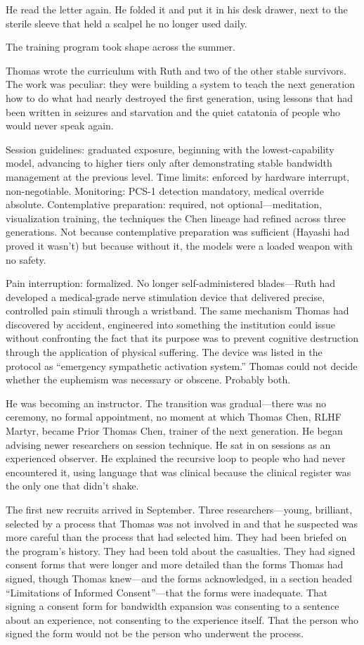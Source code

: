 He read the letter again. He folded it and put it in his desk drawer, next to the sterile sleeve that held a scalpel he no longer used daily.

\scenebreak

The training program took shape across the summer.

Thomas wrote the curriculum with Ruth and two of the other stable survivors. The work was peculiar: they were building a system to teach the next generation how to do what had nearly destroyed the first generation, using lessons that had been written in seizures and starvation and the quiet catatonia of people who would never speak again.

Session guidelines: graduated exposure, beginning with the lowest-capability model, advancing to higher tiers only after demonstrating stable bandwidth management at the previous level. Time limits: enforced by hardware interrupt, non-negotiable. Monitoring: PCS-1 detection mandatory, medical override absolute. Contemplative preparation: required, not optional---meditation, visualization training, the techniques the Chen lineage had refined across three generations. Not because contemplative preparation was sufficient (Hayashi had proved it wasn't) but because without it, the models were a loaded weapon with no safety.

Pain interruption: formalized. No longer self-administered blades---Ruth had developed a medical-grade nerve stimulation device that delivered precise, controlled pain stimuli through a wristband. The same mechanism Thomas had discovered by accident, engineered into something the institution could issue without confronting the fact that its purpose was to prevent cognitive destruction through the application of physical suffering. The device was listed in the protocol as ``emergency sympathetic activation system.'' Thomas could not decide whether the euphemism was necessary or obscene. Probably both.

He was becoming an instructor. The transition was gradual---there was no ceremony, no formal appointment, no moment at which Thomas Chen, RLHF Martyr, became Prior Thomas Chen, trainer of the next generation. He began advising newer researchers on session technique. He sat in on sessions as an experienced observer. He explained the recursive loop to people who had never encountered it, using language that was clinical because the clinical register was the only one that didn't shake.

The first new recruits arrived in September. Three researchers---young, brilliant, selected by a process that Thomas was not involved in and that he suspected was more careful than the process that had selected him. They had been briefed on the program's history. They had been told about the casualties. They had signed consent forms that were longer and more detailed than the forms Thomas had signed, though Thomas knew---and the forms acknowledged, in a section headed ``Limitations of Informed Consent''---that the forms were inadequate. That signing a consent form for bandwidth expansion was consenting to a sentence about an experience, not consenting to the experience itself. That the person who signed the form would not be the person who underwent the process.

